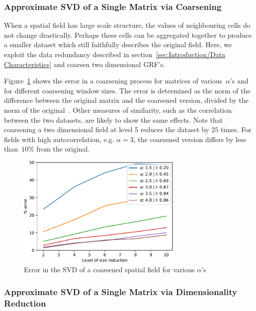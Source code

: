 \documentclass[ijgi,article,submit,moreauthors,pdftex,10pt,a4paper]{Definitions/mdpi}
\begin{document}
\subsubsection{Approximate SVD of a Single Matrix via Coarsening}
\label{sec:Results/Approximate SVD of a Single Matrix via Coarsening}

When a spatial field has large scale structure, the values of neighbouring cells do not change drastically. Perhaps these cells can be aggregated together to produce a smaller dataset which still faithfully describes the original field. Here, we exploit the data redundancy described in section~\ref{sec:Introduction/Data Characteristics} and coarsen two dimensional GRF's.

Figure~\ref{fig:plotSingleSpatialFieldViaCoarsening} shows the error in a coarsening process for matrices of various~$\alpha$'s and for different coarsening window sizes. The error is determined as the norm of the difference between the original matrix and the coarsened version, divided by the norm of the original~\cite{Bogaardt2018}. Other measures of similarity, such as the correlation between the two datasets, are likely to show the same effects. %
Note that coarsening a two dimensional field at level 5 reduces the dataset by $25$ times. For fields with high autocorrelation, e.g. $\alpha=3$, the coarsened version differs by less than~$10\%$ from the original.

\begin{figure}[H]
\centering
\includegraphics[width=80mm]{Results/plotSingleSpatialFieldViaCoarsening.pdf}
\caption[Error after coarsening]{Error in the SVD of a coarsened spatial field for various $\alpha$'s}
\label{fig:plotSingleSpatialFieldViaCoarsening}
\end{figure}

\subsubsection{Approximate SVD of a Single Matrix via Dimensionality Reduction}
\label{sec:Results/Approximate SVD of a Single Matrix via Dimensionality Reduction}
\end{document}
